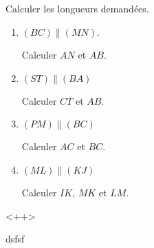 
\begin{exercice}\label{exo2smath-0060}

    Calculer les longueurs demandées.


    \begin{multicols}{2}
        \begin{enumerate}
            \item

               \( (BC)\parallel (MN)\).
\begin{center}
   
\end{center}
Calculer \( AN\) et \( AB\).

\item

    \( (ST)\parallel (BA)\)

    \begin{center}

    \end{center}
    Calculer \( CT\) et \( AB\).

\item
    \( (PM)\parallel (BC)\)

\begin{center}
   
\end{center}


    Calculer \( AC\) et \( BC\).

\item

\( (ML)\parallel (KJ)\)

\begin{center}
   
\end{center}


Calculer \( IK\), \( MK\) et \( LM\).


        \end{enumerate}
    \end{multicols}
<++>

dsfsf

\end{exercice}
